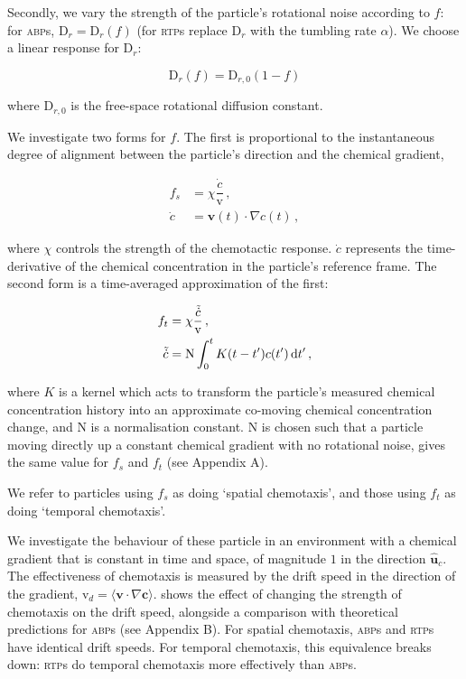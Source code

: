 \documentclass[a4wide,11pt]{article}
\begin{document}
Secondly, we vary the strength of the particle's rotational noise according to $f$: for \textsc{abp}s, $\mathrm{D}_r = \mathrm{D}_r(f)$ (for \textsc{rtp}s replace $\mathrm{D}_r$ with the tumbling rate $\alpha$). We choose a linear response for $\mathrm{D}_r$:

\begin{equation}
    \mathrm{D}_r(f) = \mathrm{D}_{r,0} (1 - f)
    \label{Dr}
\end{equation}

where $\mathrm{D}_{r,0}$ is the free-space rotational diffusion constant.

We investigate two forms for $f$. The first is proportional to the instantaneous degree of alignment between the particle's direction and the chemical gradient, 

\begin{equation}
    \begin{aligned}
        f_s &= \chi \dfrac{\dot{c}}{\mathrm{v}} \,, \\
        \dot{c} &= \mathbf{v}(t) \cdot \nabla c(t) \,,
    \end{aligned}
    \label{f_s}
\end{equation}

where $\chi$ controls the strength of the chemotactic response. $\dot{c}$ represents the time-derivative of the chemical concentration in the particle's reference frame. The second form is a time-averaged approximation of the first:

\begin{equation}
    \begin{aligned}
        f_t &= \chi \dfrac{\tilde{\dot{c}}}{\mathrm{v}} \,, \\
        \tilde{\dot{c}} &= \mathrm{N} \int_0^t K(t - t') c(t') \dif t' \,,
    \end{aligned}
    \label{f_t}
\end{equation}

where $K$ is a kernel which acts to transform the particle's measured chemical concentration history into an approximate co-moving chemical concentration change, and $\mathrm{N}$ is a normalisation constant. $\mathrm{N}$ is chosen such that a particle moving directly up a constant chemical gradient with no rotational noise, gives the same value for $f_s$ and $f_t$ (see Appendix A).

We refer to particles using $f_s$ as doing `spatial chemotaxis', and those using $f_t$ as doing `temporal chemotaxis'.

We investigate the behaviour of these particle in an environment with a chemical gradient that is constant in time and space, of magnitude $1$ in the direction $\hat{\mathbf{u}}_c$. The effectiveness of chemotaxis is measured by the drift speed in the direction of the gradient, $\mathrm{v}_d = \langle \mathbf{v} \cdot \nabla \mathbf{c} \rangle$.  shows the effect of changing the strength of chemotaxis on the drift speed, alongside a comparison with theoretical predictions for \textsc{abp}s (see Appendix B). For spatial chemotaxis, \textsc{abp}s and \textsc{rtp}s have identical drift speeds. For temporal chemotaxis, this equivalence breaks down: \textsc{rtp}s do temporal chemotaxis more effectively than \textsc{abp}s.
\end{document}
